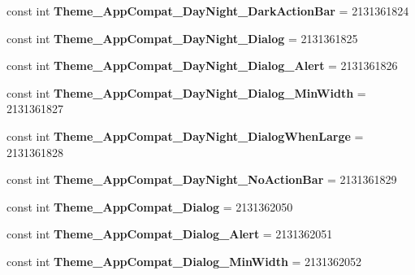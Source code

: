 \begin{DoxyCompactItemize}
const int {\bfseries Theme\+\_\+\+App\+Compat\+\_\+\+Day\+Night\+\_\+\+Dark\+Action\+Bar} = 2131361824
\item 
\mbox{\label{classXaria_1_1Resource_1_1Style_a2c6e428d18675c801418dfb3ed23456d}} 
const int {\bfseries Theme\+\_\+\+App\+Compat\+\_\+\+Day\+Night\+\_\+\+Dialog} = 2131361825
\item 
\mbox{\label{classXaria_1_1Resource_1_1Style_a97909ae13b0394aa9d6ca607ba383fbe}} 
const int {\bfseries Theme\+\_\+\+App\+Compat\+\_\+\+Day\+Night\+\_\+\+Dialog\+\_\+\+Alert} = 2131361826
\item 
\mbox{\label{classXaria_1_1Resource_1_1Style_a0ee28bc989d7ddec3e32ffed837696b6}} 
const int {\bfseries Theme\+\_\+\+App\+Compat\+\_\+\+Day\+Night\+\_\+\+Dialog\+\_\+\+Min\+Width} = 2131361827
\item 
\mbox{\label{classXaria_1_1Resource_1_1Style_a63d2fd2392c46d6b2bdf6ac5bb411d1c}} 
const int {\bfseries Theme\+\_\+\+App\+Compat\+\_\+\+Day\+Night\+\_\+\+Dialog\+When\+Large} = 2131361828
\item 
\mbox{\label{classXaria_1_1Resource_1_1Style_a5f1a14655789169546461c5283ad968e}} 
const int {\bfseries Theme\+\_\+\+App\+Compat\+\_\+\+Day\+Night\+\_\+\+No\+Action\+Bar} = 2131361829
\item 
\mbox{\label{classXaria_1_1Resource_1_1Style_aff07b4f37979b6cdf4f45c8efb06ca5b}} 
const int {\bfseries Theme\+\_\+\+App\+Compat\+\_\+\+Dialog} = 2131362050
\item 
\mbox{\label{classXaria_1_1Resource_1_1Style_ab2549e1065138747a043c1e4911e3d88}} 
const int {\bfseries Theme\+\_\+\+App\+Compat\+\_\+\+Dialog\+\_\+\+Alert} = 2131362051
\item 
\mbox{\label{classXaria_1_1Resource_1_1Style_a5dd808c0dc6139322c744cdfbf15795a}} 
const int {\bfseries Theme\+\_\+\+App\+Compat\+\_\+\+Dialog\+\_\+\+Min\+Width} = 2131362052
\item 
\mbox{\label{classXaria_1_1Resource_1_1Style_ac5ce798507886553f20a68b71abd57f5}} 

\end{DoxyCompactItemize}
